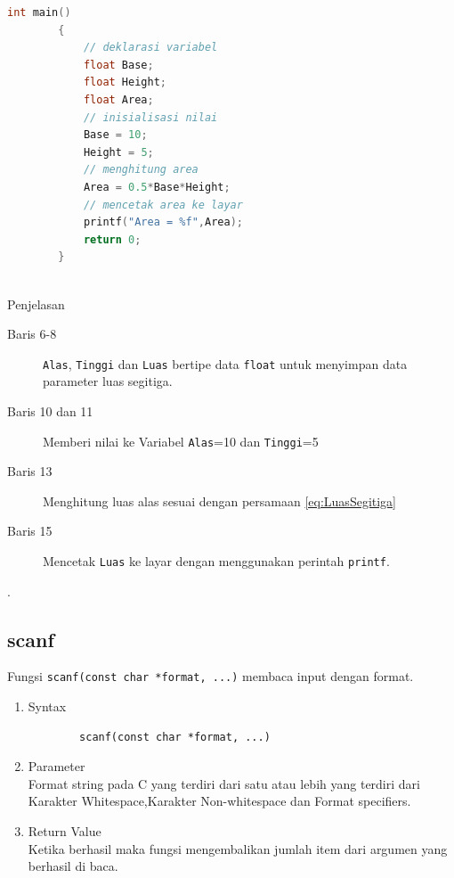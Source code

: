\begin{description}
\begin{lstlisting}[language=c,captionpos=t]
		int main()
		{
			// deklarasi variabel
			float Base;
			float Height;
			float Area;
			// inisialisasi nilai
			Base = 10;
			Height = 5;
			// menghitung area
			Area = 0.5*Base*Height;
			// mencetak area ke layar
			printf("Area = %f",Area);
			return 0;
		}
		
	\end{lstlisting}
	
	Penjelasan
	\begin{description}
		\item[Baris 6-8]  \verb|Alas|, \verb|Tinggi| dan \verb|Luas| bertipe data \verb|float| untuk menyimpan data parameter luas segitiga.
		\item[Baris 10 dan 11] Memberi nilai ke Variabel \verb|Alas|=10 dan \verb|Tinggi|=5
		\item[Baris 13] Menghitung luas alas sesuai dengan persamaan \ref{eq:LuasSegitiga}
		\item[Baris 15] Mencetak \verb|Luas| ke layar dengan menggunakan perintah \verb|printf|.
	\end{description}
\end{description}

.\subsection{scanf}
Fungsi  \verb*|scanf(const char *format, ...)| membaca input dengan format.

\begin{enumerate}
	\item Syntax 
	\begin{verbatim}
		scanf(const char *format, ...)
	\end{verbatim}
	\item Parameter \\
	Format string pada C yang terdiri dari satu atau lebih yang terdiri dari \\
	Karakter Whitespace,Karakter Non-whitespace  dan  Format specifiers. 
	\item Return Value \\
	Ketika berhasil maka fungsi mengembalikan jumlah item dari argumen yang berhasil di baca.
	
\end{enumerate}


